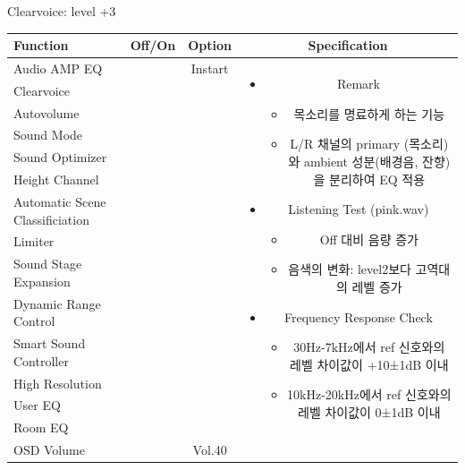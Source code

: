 \documentclass{beamer}
\begin{document}
\begin{frame}[t]{Clearvoice: level +3}
\begin{tiny}
\begin{tabular}{@{}lccc@{}}
\toprule
Function & Off/On & Option & Specification \\
\midrule
Audio AMP EQ & \color{black}{Off} & Instart &
\multirow{14}{60mm}{
\begin{itemize}
\item Remark
	\begin{itemize}
	\item 목소리를 명료하게 하는 기능
	\item L/R 채널의 primary (목소리)와 ambient 성분(배경음, 잔향)을 분리하여 EQ 적용
	\end{itemize}
\item Listening Test (pink.wav)
	\begin{itemize}
	\item Off 대비 음량 증가
	\item 음색의 변화: level2보다 고역대의 레벨 증가
	\end{itemize}
\item Frequency Response Check
  \begin{itemize}
  \item 30Hz-7kHz에서 ref 신호와의 레벨 차이값이 +10±1dB 이내
  \item 10kHz-20kHz에서 ref 신호와의 레벨 차이값이 0±1dB 이내
  \end{itemize}
\end{itemize}
} \\
Clearvoice & \color{blue}{On} & \color{blue}{+3} & \\
Autovolume & \color{black}{Off} & & \\
Sound Mode & \color{black}{Off} & & \\
Sound Optimizer & \color{black}{Off} & & \\
Height Channel & \color{black}{Off} & & \\
Automatic Scene Classificiation & \color{black}{Off} & & \\
Limiter & \color{black}{Off} & & \\
Sound Stage Expansion & \color{black}{Off} & & \\
Dynamic Range Control & \color{black}{Off} & & \\
Smart Sound Controller & \color{black}{Off} & & \\
High Resolution & \color{black}{Off} & & \\
User EQ & \color{black}{Off} & & \\
Room EQ & \color{black}{Off} & & \\
OSD Volume & \color{blue}{On} & Vol.40 & \\
\midrule
\end{tabular}
\end{tiny}


\end{frame}
\end{document}
